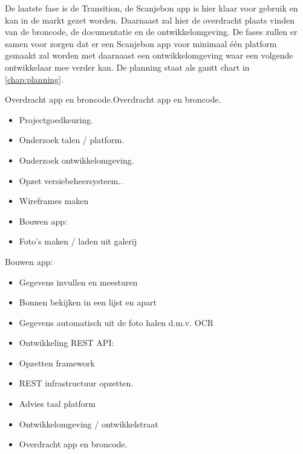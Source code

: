 \documentclass[a4paper,11pt,oneside]{report}
\begin{document}
De laatste fase is de Transition, de Scanjebon app is hier klaar voor gebruik en kan in de markt gezet worden. Daarnaast zal hier de overdracht plaats vinden van de broncode, de documentatie en de ontwikkelomgeving. De fases zullen er samen voor zorgen dat er een Scanjebon app voor minimaal één platform gemaakt zal worden met daarnaast een ontwikkelomgeving waar een volgende ontwikkelaar mee verder kan. De planning staat als gantt chart in \ref{chap:planning}.
\begin{description}
Overdracht app en broncode.Overdracht app en broncode.
  \item[Fase 1: Inception]
    \item \mbox{}
    \begin{itemize}
      \item Projectgoedkeuring.
      \item Onderzoek talen / platform.
      \item Onderzoek ontwikkelomgeving.
    \end{itemize}
  \item[Fase 2: Elaboration]
    \item \mbox{}
    \begin{itemize}
      \item Opzet versiebeheersysteem..
      \item Wireframes maken
      \item Bouwen app:
      \item Foto’s maken / laden uit galerij
    \end{itemize}
  \item[Fase 3: Construction]
    \item \mbox{}
    Bouwen app:
    \begin{itemize}
      \item Gegevens invullen en meesturen
      \item Bonnen bekijken in een lijst en apart
      \item Gegevens automatisch uit de foto halen d.m.v. OCR
      \item Ontwikkeling REST API:
      \item Opzetten framework
      \item REST infrastructuur opzetten.
    \end{itemize}
  \item[Fase 4: Transition]
    \item \mbox{}
    \begin{itemize}
      \item Advies taal platform
      \item Ontwikkelomgeving / ontwikkelstraat
      \item Overdracht app en broncode.
    \end{itemize}
\end{description}
\end{document}
